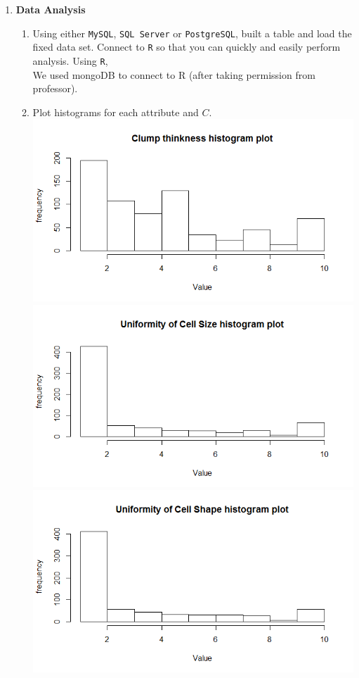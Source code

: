\documentclass{article}
\begin{document}
\begin{enumerate}
  \item {\bf Data Analysis}
   \begin{enumerate} \item Using either \texttt{MySQL}, \texttt{SQL Server} or \texttt{PostgreSQL}, built a table and load the fixed data set.  Connect to \texttt{R} so that you can quickly and easily perform analysis.  Using \texttt{R}, \\
  We used mongoDB to connect to R (after taking permission from professor).
\item Plot histograms for each attribute and $C$. \\
\includegraphics[width=\textwidth]{Clumpthickness.png}
\includegraphics[width=\textwidth]{cellsize.png}
\includegraphics[width=\textwidth]{cellshape.png}

\end{enumerate}
\end{enumerate}
\end{document}
